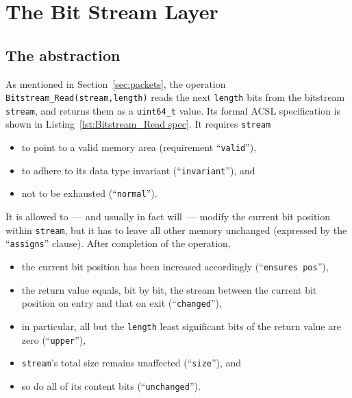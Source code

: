 

\FloatBarrier

\chapter{The Bit Stream Layer}
\label{sec:bitstream}









\section{The  abstraction}

As mentioned in Section~\ref{sec:packets},
the operation 
\lstinline{Bitstream_Read(stream,length)}
reads the next \lstinline{length} bits from the bitstream
\lstinline{stream}, and returns them as a \lstinline{uint64_t} value.
%
Its formal ACSL specification is shown in 
Listing~\ref{lst:Bitstream_Read spec}.
%
It requires \lstinline{stream}
%
\begin{itemize}
\item to point to a valid memory area 
	(requirement ``\lstinline{valid}''),
\item to adhere to its data type invariant
	(``\lstinline{invariant}''), and
\item not to be exhausted (``\lstinline{normal}'').
\end{itemize}
%
It is allowed to ---~and usually in fact will~--- modify the current bit
position within \lstinline{stream}, but it has to leave all other memory
unchanged (expressed by the ``\lstinline{assigns}'' clause).
%
After completion of the operation, 
%
\begin{itemize}
\item the current bit position has been increased accordingly
	(``\lstinline{ensures pos}''),
\item the return value equals, bit by bit, the stream between the
	current bit position on entry and that on exit
	(``\lstinline{changed}''),
\item in particular, all but the \lstinline{length} least significant
	bits of the return value are zero
	(``\lstinline{upper}''),
\item \lstinline{stream}'s total size remains unaffected
	(``\lstinline{size}''), and
\item so do all of its content bits
	(``\lstinline{unchanged}'').
\end{itemize}



